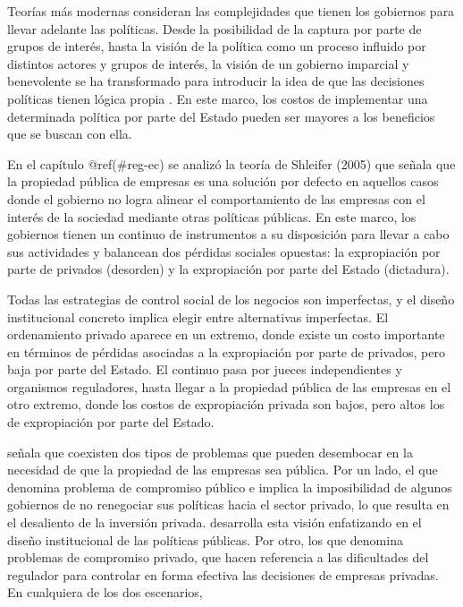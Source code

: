 \documentclass[
  12pt,
  spanish,
]{book}
\begin{document}
Teorías más modernas consideran las complejidades que tienen los gobiernos para llevar adelante las políticas. Desde la posibilidad de la captura por parte de grupos de interés, hasta la visión de la política como un proceso influido por distintos actores y grupos de interés, la visión de un gobierno imparcial y benevolente se ha transformado para introducir la idea de que las decisiones políticas tienen lógica propia \citep{Dixit1997}. En este marco, los costos de implementar una determinada política por parte del Estado pueden ser mayores a los beneficios que se buscan con ella.

En el capítulo @ref(\#reg-ec) se analizó la teoría de Shleifer (2005) que señala que la propiedad pública de empresas es una solución por defecto en aquellos casos donde el gobierno no logra alinear el comportamiento de las empresas con el interés de la sociedad mediante otras políticas públicas. En este marco, los gobiernos
tienen un continuo de instrumentos a su disposición para llevar a cabo sus actividades y balancean dos pérdidas sociales opuestas: la expropiación por parte de privados (desorden) y la expropiación por parte del Estado (dictadura).

Todas las estrategias de control social de los negocios son imperfectas, y el diseño institucional concreto implica elegir entre alternativas imperfectas. El ordenamiento privado aparece en un extremo, donde existe un costo importante en términos de pérdidas asociadas a la expropiación por parte de privados, pero baja por parte del Estado. El continuo pasa por jueces independientes y organismos reguladores, hasta llegar a la propiedad pública de las empresas en el otro extremo, donde los costos de expropiación privada son bajos, pero altos los de expropiación por parte del Estado.

\citet{Perotti2004} señala que coexisten dos tipos de problemas que pueden desembocar en la necesidad de que la propiedad de las empresas sea pública. Por un lado, el que denomina problema de compromiso público e implica la imposibilidad de algunos gobiernos de no renegociar sus políticas hacia el sector privado, lo que resulta en el desaliento de la inversión privada. \citet{Bergara2003} desarrolla esta visión enfatizando en el diseño institucional de las políticas públicas. Por otro, los que denomina problemas de compromiso privado, que hacen referencia a las dificultades del regulador para controlar en forma efectiva las decisiones de empresas privadas. En cualquiera de los dos escenarios,
\end{document}

